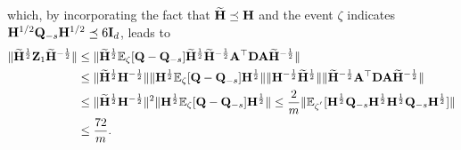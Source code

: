 \documentclass[11pt,a4paper]{article}
\begin{document}
which, by incorporating  the fact that  $\widetilde{\mathbf{H}}\preceq \mathbf{H}$ and  the event $\zeta$ indicates $\mathbf{H}^{1/2}\mathbf{Q}_{-s}\mathbf{H}^{1/2}\preceq 6\mathbf{I}_d$,   leads to 
\begin{align}
   \|\widetilde{\mathbf{H}}^{\frac{1}{2}}\mathbf{Z}_1\widetilde{\mathbf{H}}^{-\frac{1}{2}}\|&\leq \|\widetilde{\mathbf{H}}^{\frac{1}{2}}{\mathbb{E}}_{\zeta}[\mathbf{Q}-\mathbf{Q}_{-s}]\widetilde{\mathbf{H}}^{\frac{1}{2}}\widetilde{\mathbf{H}}^{-\frac{1}{2}}\mathbf{A}^\top\mathbf{D}\mathbf{A}\widetilde{\mathbf{H}}^{-\frac{1}{2}}\| \nonumber\\
   &\leq \|\widetilde{\mathbf{H}}^{\frac{1}{2}}\mathbf{H}^{-\frac{1}{2}}\|\|\mathbf{H}^{\frac{1}{2}}{\mathbb{E}}_{\zeta}[\mathbf{Q}-\mathbf{Q}_{-s}]\mathbf{H}^{\frac{1}{2}}\| \| \mathbf{H}^{-\frac{1}{2}}\widetilde{\mathbf{H}}^{\frac{1}{2}}\|
  \|\widetilde{\mathbf{H}}^{-\frac{1}{2}}\mathbf{A}^\top\mathbf{D}\mathbf{A}\widetilde{\mathbf{H}}^{-\frac{1}{2}}\| \nonumber\\
   &\leq \|\widetilde{\mathbf{H}}^{\frac{1}{2}}\mathbf{H}^{-\frac{1}{2}}\|^2 \| \mathbf{H}^{\frac{1}{2}}{\mathbb{E}}_{\zeta}[\mathbf{Q}-\mathbf{Q}_{-s}] \mathbf{H}^{\frac{1}{2}}\|\leq  \frac{2}{m}\|{\mathbb{E}}_{\zeta^{'}}[ \mathbf{H}^{\frac{1}{2}}\mathbf{Q}_{-s} \mathbf{H}^{\frac{1}{2}} \mathbf{H}^{\frac{1}{2}}\mathbf{Q}_{-s} \mathbf{H}^{\frac{1}{2}}]\|\nonumber\\
      & \leq\frac{72}{m}. \label{eq:z_1}
\end{align}
\end{document}
